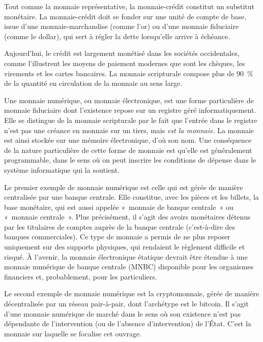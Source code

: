 Tout comme la monnaie représentative, la monnaie-crédit constitut un substitut monétaire. La monnaie-crédit doit se fonder sur une unité de compte de base, issue d'une monnaie-marchandise (comme l'or) ou d'une monnaie fiduciaire (comme le dollar), qui sert à régler la dette lorsqu'elle arrive à échéance.

Aujourd'hui, le crédit est largement monétisé dans les sociétés occidentales, comme l'illustrent les moyens de paiement modernes que sont les chèques, les virements et les cartes bancaires. La monnaie scripturale compose plus de 90~\% de la quantité en circulation de la monnaie au sens large.


Une monnaie numérique, ou monnaie électronique, est une forme particulière de monnaie fiduciaire dont l'existence repose sur un registre géré informatiquement. Elle se distingue de la monnaie scripturale par le fait que l'entrée dans le registre n'est pas une créance en monnaie sur un tiers, mais \emph{est la monnaie}. La monnaie est ainsi stockée sur une mémoire électronique, d'où son nom. Une conséquence de la nature particulière de cette forme de monnaie est qu'elle est généralement programmable, dans le sens où on peut inscrire les conditions de dépense dans le système informatique qui la soutient.

Le premier exemple de monnaie numérique est celle qui est gérée de manière centralisée par une banque centrale. Elle constitue, avec les pièces et les billets, la base monétaire, qui est aussi appelée «~monnaie de banque centrale~» ou «~monnaie centrale~». Plus précisément, il s'agit des avoirs monétaires détenus par les titulaires de comptes auprès de la banque centrale (c'est-à-dire des banques commerciales). Ce type de monnaie a permis de ne plus reposer uniquement sur des supports physiques, qui rendaient le règlement difficile et risqué. À l'avenir, la monnaie électronique étatique devrait être étendue à une monnaie numérique de banque centrale (MNBC) disponible pour les organismes financiers et, probablement, pour les particuliers. %

Le second exemple de monnaie numérique est la cryptomonnaie, gérée de manière décentralisée par un réseau pair-à-pair, dont l'archétype est le bitcoin. Il s'agit d'une monnaie numérique de marché dans le sens où son existence n'est pas dépendante de l'intervention (ou de l'absence d'intervention) de l'État. C'est la monnaie sur laquelle se focalise cet ouvrage.

